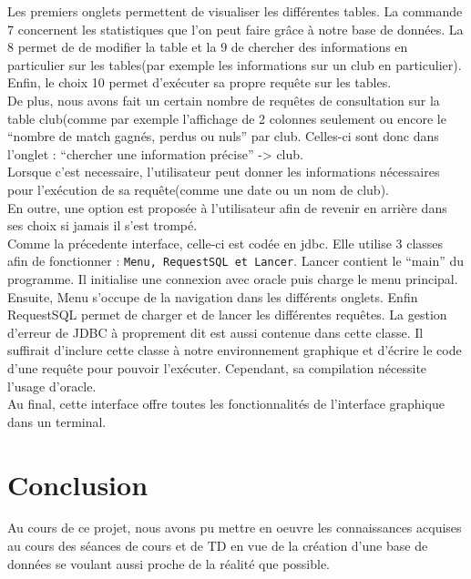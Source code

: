 \documentclass{article}
\begin{document}
Les premiers onglets permettent de visualiser les différentes tables. La commande 7 concernent les statistiques que l'on peut faire grâce à notre base de données. La 8 permet de de modifier la table et la 9 de chercher des informations en particulier sur les tables(par exemple les informations sur un club en particulier). Enfin, le choix 10 permet d'exécuter sa propre requête sur les tables.\\

De plus, nous avons fait un certain nombre de requêtes de consultation sur la table club(comme par exemple l'affichage de 2 colonnes seulement ou encore le ``nombre de match gagnés, perdus ou nuls'' par club. Celles-ci sont donc dans l'onglet : ``chercher une information précise'' -> club.\\
Lorsque c'est necessaire, l'utilisateur peut donner les informations nécessaires pour l'exécution de sa requête(comme une date ou un nom de club).\\

En outre, une option est proposée à l'utilisateur afin de revenir en arrière dans ses choix si jamais il s'est trompé.\\
Comme la précedente interface, celle-ci est codée en jdbc. Elle utilise 3 classes afin de fonctionner : \texttt{Menu, RequestSQL et Lancer}. Lancer contient le ``main'' du programme. Il initialise une connexion avec oracle puis charge le menu principal. Ensuite, Menu s'occupe de la navigation dans les différents onglets. Enfin RequestSQL permet de charger et de lancer les différentes requêtes. La gestion d'erreur de JDBC à proprement dit est aussi contenue dans cette classe. Il suffirait d'inclure cette classe à notre environnement graphique et d'écrire le code d'une requête pour pouvoir l'exécuter. Cependant, sa compilation nécessite l'usage d'oracle.\\

Au final, cette interface offre toutes les fonctionnalités de l'interface graphique dans un terminal. \\


\section*{Conclusion}
Au cours de ce projet, nous avons pu mettre en oeuvre les connaissances acquises au cours des séances de cours et de TD en vue de la création d'une base de données se voulant aussi proche de la réalité que possible. \\
\end{document}
